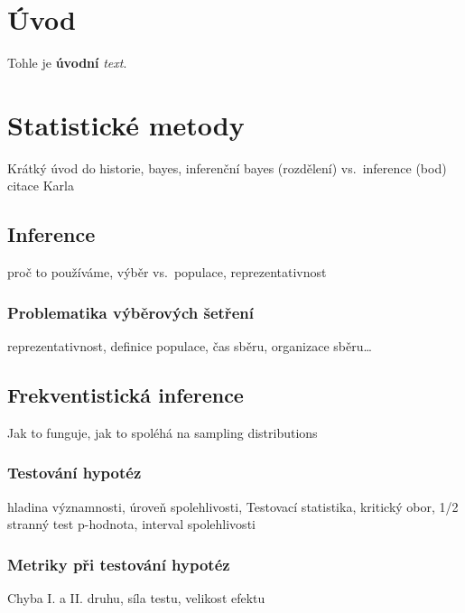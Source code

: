 \documentclass[
  11pt,
  a4paper]{report}
\begin{document}
\chapter*{Úvod}

Tohle je \textbf{úvodní} \emph{text}.

\chapter{Statistické metody}\label{statistickuxe9-metody}

Krátký úvod do historie, bayes, inferenční bayes (rozdělení)
vs.~inference (bod) citace Karla

\section{Inference}\label{inference}

proč to používáme, výběr vs.~populace, reprezentativnost

\subsection{Problematika výběrových
šetření}\label{problematika-vuxfdbux11brovuxfdch-ux161etux159enuxed}

reprezentativnost, definice populace, čas sběru, organizace
sběru\ldots{}

\section{Frekventistická inference}\label{frekventistickuxe1-inference}

Jak to funguje, jak to spoléhá na sampling distributions

\subsection{Testování hypotéz}\label{testovuxe1nuxed-hypotuxe9z}

hladina významnosti, úroveň spolehlivosti, Testovací statistika,
kritický obor, 1/2 stranný test p-hodnota, interval spolehlivosti

\subsection{Metriky při testování
hypotéz}\label{metriky-pux159i-testovuxe1nuxed-hypotuxe9z}

Chyba I. a II. druhu, síla testu, velikost efektu
\end{document}
